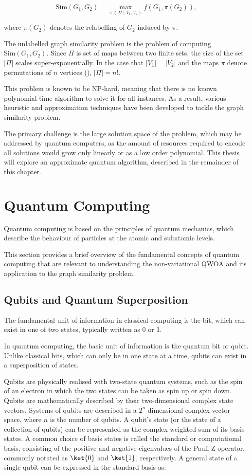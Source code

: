 $$\text{Sim}(G_1,G_2)= \max_{\pi\in\Pi(V_1,V_2)} f(G_1, \pi(G_2)),$$

where $\pi(G_2)$ denotes the relabelling of $G_2$ induced by $\pi$.

The unlabelled graph similarity problem is the problem of computing $\text{Sim}(G_1,G_2)$. Since $\Pi$ is set of maps between two finite sets, the size of the set $|\Pi|$ scales super-exponentially. In the case that $|V_1|=|V_2|$ and the maps $\pi$ denote permutations of $n$ vertices (), $|\Pi|=n!$.

This problem is known to be NP-hard, meaning that there is no known polynomial-time algorithm to solve it for all instances. As a result, various heuristic and approximation techniques have been developed to tackle the graph similarity problem. 

The primary challenge is the large solution space of the problem, which may be addressed by quantum computers, as the amount of resources required to encode all solutions would grow only linearly or as a low order polynomial. This thesis will explore an approximate quantum algorithm, described in the remainder of this chapter.

\section{Quantum Computing}
Quantum computing is based on the principles of quantum mechanics, which describe the behaviour of particles at the atomic and subatomic levels.

This section provides a brief overview of the fundamental concepts of quantum computing that are relevant to understanding the non-variational QWOA and its application to the graph similarity problem. 

\subsection{Qubits and Quantum Superposition}

The fundamental unit of information in classical computing is the bit, which can exist in one of two states, typically written as 0 or 1.

In quantum computing, the basic unit of information is the quantum bit or qubit. Unlike classical bits, which can only be in one state at a time, qubits can exist in a superposition of states.

Qubits are physically realised with two-state quantum systems, such as the spin of an electron in which the two states can be taken as spin up or spin down. Qubits are mathematically described by their two-dimensional complex state vectors. Systems of qubits are described in a $2^n$ dimensional complex vector space, where $n$ is the number of qubits. A qubit's state (or the state of a collection of qubits) can be represented as the complex weighted sum of its basis states. A common choice of basis states is called the standard or computational basis, consisting of the positive and negative eigenvalues of the Pauli Z operator, commonly notated as $\ket{0}$ and $\ket{1}$, respectively. A general state of a single qubit can be expressed in the standard basis as:

